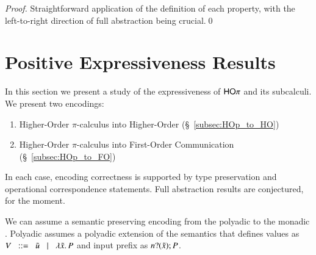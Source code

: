\begin{proof}
	Straightforward application of the definition of each property, with the left-to-right direction of
	full abstraction being crucial.\qed
\end{proof}


\section{Positive Expressiveness Results}\label{s:positive}
In this section we present a study of the expressiveness of $\mathsf{HO}\pi$ and its subcalculi. 
We present two encodings:
%
\begin{enumerate}[1.]
	\item Higher-Order $\pi$-calculus into Higher-Order  (\S~\ref{subsec:HOp_to_HO})
	\item Higher-Order $\pi$-calculus into First-Order Communication (\S~\ref{subsec:HOp_to_FO})
\end{enumerate}
%
In each case, encoding correctness is supported by type preservation and operational correspondence statements.
Full abstraction results are conjectured, for the moment.

\begin{remark}
	We can assume a semantic preserving encoding from the polyadic
	\HOp to the monadic \HOp. Polyadic \HOp assumes a polyadic
	extension of the \HOp semantics that defines values as
	$V \;\;::=\;\; \tilde{u} \;\;\;|\;\;\; \lambda \tilde{x}.\,P$
	and input prefix as $n ? (\tilde{x}) ; P$.
\end{remark}

